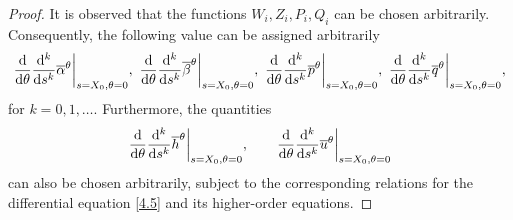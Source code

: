 \documentclass[11pt,reqno]{article}
\newcommand{\fr}{\frac}
\numberwithin{equation}{section}
\begin{document}
\begin{proof}
It is observed that the functions $W_i, Z_i, P_i, Q_i$ can be chosen arbitrarily. Consequently,
the following value can be assigned arbitrarily
\begin{align}\label{4.29}
\fr{{\rm d}}{{\rm d}\theta}\fr{{\rm d}^k}{{\rm d}s^k}\overline{\alpha}^\theta\bigg|_{s=X_0, \theta=0},\  \fr{{\rm d}}{{\rm d}\theta}\fr{{\rm d}^k}{{\rm d}s^k}\overline{\beta}^\theta\bigg|_{s=X_0, \theta=0},\ \fr{{\rm d}}{{\rm d}\theta}\fr{{\rm d}^k}{{\rm d}s^k}\overline{p}^\theta\bigg|_{s=X_0, \theta=0},\ \fr{{\rm d}}{{\rm d}\theta}\fr{{\rm d}^k}{{\rm d}s^k}\overline{q}^\theta\bigg|_{s=X_0, \theta=0},
\end{align}
for $k=0,1,\dots$. Furthermore, the quantities
$$
\fr{{\rm d}}{{\rm d}\theta}\fr{{\rm d}^k}{{\rm d}s^k}\overline{h}^\theta\bigg|_{s=X_0, \theta=0},\qquad \fr{{\rm d}}{{\rm d}\theta}\fr{{\rm d}^k}{{\rm d}s^k}\overline{u}^\theta\bigg|_{s=X_0, \theta=0}
$$
can also be chosen arbitrarily, subject to the corresponding relations for the differential equation \eqref{4.5} and its higher-order equations.


\end{proof}
\end{document}
